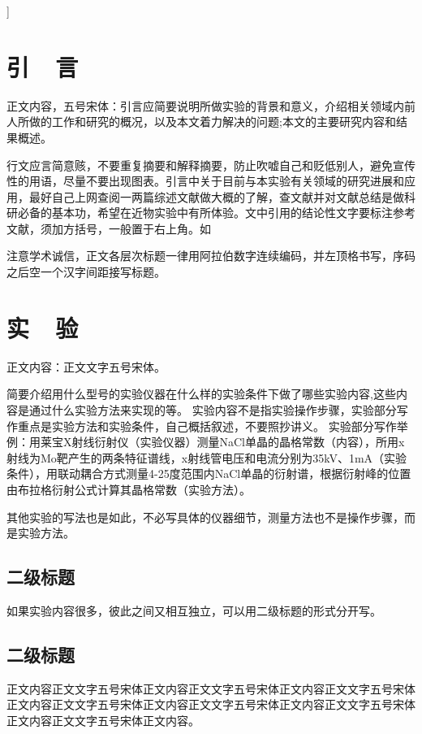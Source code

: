 \documentclass{thuemp}
\begin{document}
]
\wuhao 

\section{引~~言}
\enlargethispage{-3.3cm}
正文内容，五号宋体：引言应简要说明所做实验的背景和意义，介绍相关领域内前人所做的工作和研究的概况，以及本文着力解决的问题;本文的主要研究内容和结果概述。

行文应言简意赅，不要重复摘要和解释摘要，防止吹嘘自己和贬低别人，避免宣传性的用语，尽量不要出现图表。引言中关于目前与本实验有关领域的研究进展和应用，最好自己上网查阅一两篇综述文献做大概的了解，查文献并对文献总结是做科研必备的基本功，希望在近物实验中有所体验。文中引用的结论性文字要标注参考文献，须加方括号，一般置于右上角。如\cite{王合英2008磁控溅射镀膜过程中非均匀磁场中电子的运动, 王合英2018自主探究实验对学生综合素质和创新能力的培养}

注意学术诚信，正文各层次标题一律用阿拉伯数字连续编码，并左顶格书写，序码之后空一个汉字间距接写标题。


\section{实~~验}
正文内容：正文文字五号宋体。

简要介绍用什么型号的实验仪器在什么样的实验条件下做了哪些实验内容,这些内容是通过什么实验方法来实现的等。
实验内容不是指实验操作步骤，实验部分写作重点是实验方法和实验条件，自己概括叙述，不要照抄讲义。
实验部分写作举例：用莱宝X射线衍射仪（实验仪器）测量NaCl单晶的晶格常数（内容），所用x射线为Mo靶产生的两条特征谱线，x射线管电压和电流分别为35kV、1mA（实验条件），用联动耦合方式测量4-25度范围内NaCl单晶的衍射谱，根据衍射峰的位置由布拉格衍射公式计算其晶格常数（实验方法）。


其他实验的写法也是如此，不必写具体的仪器细节，测量方法也不是操作步骤，而是实验方法。

\subsection{二级标题}
如果实验内容很多，彼此之间又相互独立，可以用二级标题的形式分开写。

\subsection{二级标题}
正文内容正文文字五号宋体正文内容正文文字五号宋体正文内容正文文字五号宋体正文内容正文文字五号宋体正文内容正文文字五号宋体正文内容正文文字五号宋体正文内容正文文字五号宋体正文内容。
\end{document}
